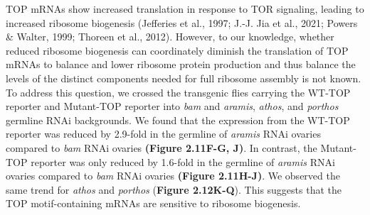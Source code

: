 \documentclass[12pt,oneside]{reedthesis}
\begin{document}
\textbf{\hfill\break
}

TOP mRNAs show increased translation in response to TOR signaling, leading to increased ribosome biogenesis (Jefferies et al., 1997; J.-J. Jia et al., 2021; Powers \& Walter, 1999; Thoreen et al., 2012). However, to our knowledge, whether reduced ribosome biogenesis can coordinately diminish the translation of TOP mRNAs to balance and lower ribosome protein production and thus balance the levels of the distinct components needed for full ribosome assembly is not known. To address this question, we crossed the transgenic flies carrying the WT-TOP reporter and Mutant-TOP reporter into \emph{bam} and \emph{aramis}, \emph{athos}, and \emph{porthos} germline RNAi backgrounds. We found that the expression from the WT-TOP reporter was reduced by 2.9-fold in the germline of \emph{aramis} RNAi ovaries compared to \emph{bam} RNAi ovaries \textbf{(Figure 2.11F-G, J)}. In contrast, the Mutant-TOP reporter was only reduced by 1.6-fold in the germline of \emph{aramis} RNAi ovaries compared to \emph{bam} RNAi ovaries \textbf{(Figure 2.11H-J)}. We observed the same trend for \emph{athos} and \emph{porthos} (\textbf{Figure 2.12K-Q}). This suggests that the TOP motif-containing mRNAs are sensitive to ribosome biogenesis.
\end{document}
